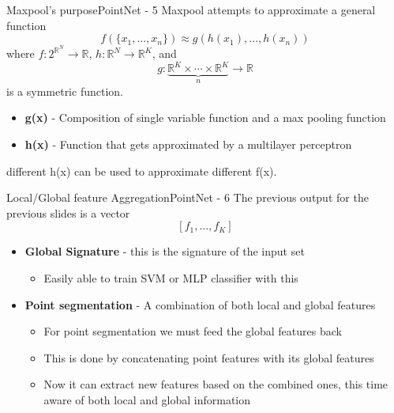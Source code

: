 \documentclass{beamer}
\begin{document}
		\begin{frame}{Maxpool's purpose}{PointNet - 5}\small
            Maxpool attempts to approximate a general function \[f(\{x_1, \ldots, x_n\}) \approx g(h(x_1), \ldots, h(x_n))\]
            where \( f : 2^{\mathbb{R}^N} \to \mathbb{R} \), \( h : \mathbb{R}^N \to \mathbb{R}^K \), and  \[
                g : \underbrace{\mathbb{R}^K \times \cdots \times \mathbb{R}^K}_{n} 
                \to \mathbb{R}
            \]
            is a symmetric function.
            
			\begin{itemize}\normalsize
				\item \textbf{g(x)} - Composition of single variable function and a max pooling function
                \item \textbf{h(x)} - Function that gets approximated by a multilayer perceptron
			\end{itemize}
            different h(x) can be used to approximate different f(x).
		\end{frame}

		\begin{frame}{Local/Global feature Aggregation}{PointNet - 6}
			The previous output for the previous slides is a vector \[[f_1,...,f_K]\]
			\begin{itemize}
				\item \textbf{Global Signature} - this is the signature of the input set
                \begin{itemize}
                    \item Easily able to train SVM or MLP classifier with this
                \end{itemize}
				\item \textbf{Point segmentation} - A combination of both local and global features
                \begin{itemize}
                    \item For point segmentation we must feed the global features back 
                    \item This is done by concatenating point features with its global features
                    \item Now it can extract new features based on the combined ones, this time aware of both local and global information
                \end{itemize}
			\end{itemize}
		\end{frame}
		
\end{document}
